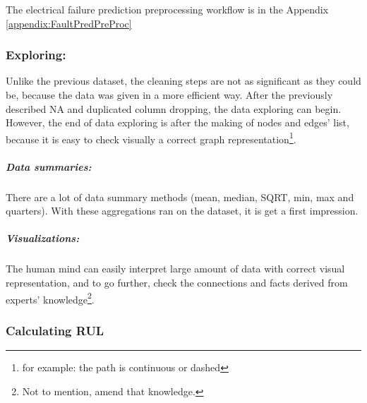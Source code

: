 		The electrical failure prediction preprocessing workflow is in the Appendix \ref{appendix:FaultPredPreProc}
		\subsubsection{Exploring:}
			Unlike the previous dataset, the cleaning steps are not as significant as they could be, because the data was given in a more efficient way. After the previously described NA and duplicated column dropping, the data exploring can begin. However, the end of data exploring is after the making of nodes and edges' list, because it is easy to check visually a correct graph representation\footnote{for example: the path is continuous or dashed}.
			\subparagraph{Data summaries:}
			There are a lot of data summary methods (mean, median, SQRT, min, max and quarters). With these aggregations ran on the dataset, it is get a first impression. 
			\subparagraph{Visualizations:}
			The human mind can easily interpret large amount of data with correct visual representation, and to go further, check the connections and facts derived from experts' knowledge\footnote{Not to mention, amend that knowledge.}.
		\subsubsection{Calculating RUL}
